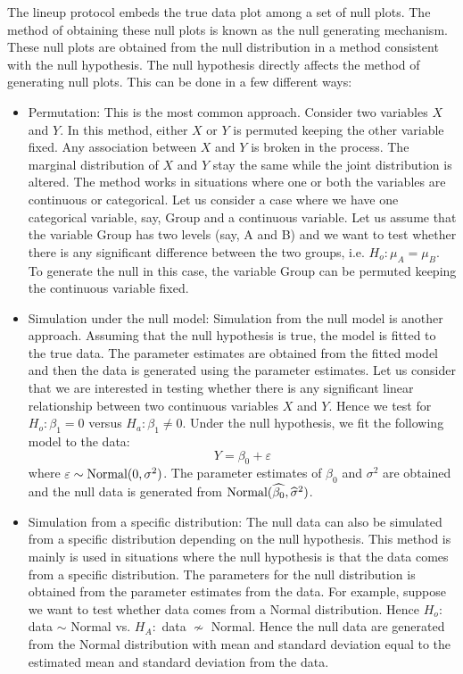 \documentclass[12]{article}
\begin{document}
The lineup protocol embeds the true data plot among a set of null plots. The method of obtaining these null plots is known as the null generating mechanism. These null plots are obtained from the null distribution in a method consistent with the null hypothesis. The null hypothesis directly affects the method of generating null plots. This can be done in a few different ways:
\begin{itemize}
\item Permutation: This is the most common approach. Consider two variables $X$ and $Y$. In this method,  either $X$ or $Y$ is permuted keeping the other variable fixed. Any association between $X$ and $Y$ is broken in the process. The marginal distribution of $X$ and $Y$ stay the same while the joint distribution is altered. The method works in situations where one or both the variables are continuous or categorical. Let us consider a case where we have one categorical variable, say, Group and a continuous variable. Let us assume that the variable Group has two levels (say, A and B) and we want to test whether there is any significant difference between the two groups, i.e. $H_o: \mu_A = \mu_B$. To generate the null in this case,  the variable Group can be permuted keeping the continuous variable fixed. 
\item Simulation under the null model: Simulation from the null model is another approach. Assuming that the null hypothesis is true, the model is fitted to the true data. The parameter estimates are obtained from the fitted model and then the data is generated using the parameter estimates. Let us consider that we are interested in testing whether there is any significant linear relationship between two continuous variables $X$ and $Y$. Hence we test for $H_o : \beta_1 = 0$ versus $H_a: \beta_1 \ne 0$. Under the null hypothesis, we fit the following model to the data:
$$Y = \beta_0 + \varepsilon$$
where $\varepsilon \sim \hbox{Normal}(0, \sigma^2)$. The parameter estimates of $\beta_0$ and $\sigma^2$ are obtained and the null data is generated from $\hbox{Normal}(\widehat{\beta_0}, \widehat{\sigma}^2)$. 
\item Simulation from a specific distribution: The null data can also be simulated from a specific distribution depending on the null hypothesis. This method is mainly is used in situations where the null hypothesis is that the data comes from a specific distribution. The parameters for the null distribution is obtained from the parameter estimates from the data. For example, suppose we want to test whether data comes from a Normal distribution. Hence $H_o:$ data $\sim$ Normal vs. $H_A:$ data $\nsim$ Normal. Hence the null data are generated from the Normal distribution with mean and standard deviation equal to the estimated mean and standard deviation from the data. 
\end{itemize} 
\end{document}
